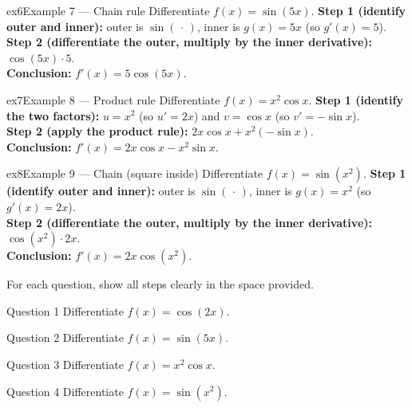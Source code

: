 \documentclass[11pt]{article}
\begin{document}
\begin{example}{ex6}{Example 7 --- Chain rule}
Differentiate $f(x)=\sin(5x)$.\soln
\textbf{Step 1 (identify outer and inner):} outer is $\sin(\,\cdot\,)$, inner is $g(x)=5x$ (so $g'(x)=5$).\\[3pt]
\textbf{Step 2 (differentiate the outer, multiply by the inner derivative):} $\cos(5x)\cdot5$.\\[3pt]
\textbf{Conclusion:} $f'(x)=5\cos(5x)$.
\end{example}

\begin{example}{ex7}{Example 8 --- Product rule}
Differentiate $f(x)=x^2\cos x$.\soln
\textbf{Step 1 (identify the two factors):} $u=x^2$ (so $u'=2x$) and $v=\cos x$ (so $v'=-\sin x$).\\[3pt]
\textbf{Step 2 (apply the product rule):} $2x\cos x+x^2(-\sin x)$.\\[3pt]
\textbf{Conclusion:} $f'(x)=2x\cos x-x^2\sin x$.
\end{example}

\begin{example}{ex8}{Example 9 --- Chain (square inside)}
Differentiate $f(x)=\sin(x^2)$.\soln
\textbf{Step 1 (identify outer and inner):} outer is $\sin(\,\cdot\,)$, inner is $g(x)=x^2$ (so $g'(x)=2x$).\\[3pt]
\textbf{Step 2 (differentiate the outer, multiply by the inner derivative):} $\cos(x^2)\cdot2x$.\\[3pt]
\textbf{Conclusion:} $f'(x)=2x\cos(x^2)$.
\end{example}

\clearpage
{}
For each question, show all steps clearly in the space provided.

\begin{qbox}{Question 1}
Differentiate $f(x)=\cos(2x)$.\workspace{2.4cm}
\end{qbox}

\begin{qbox}{Question 2}
Differentiate $f(x)=\sin(5x)$.\workspace{2.4cm}
\end{qbox}

\begin{qbox}{Question 3}
Differentiate $f(x)=x^2\cos x$.\workspace{2.4cm}
\end{qbox}

\begin{qbox}{Question 4}
Differentiate $f(x)=\sin(x^2)$.\workspace{2.4cm}
\end{qbox}
\end{document}
